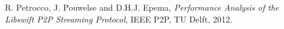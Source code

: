 \documentclass[pdftex, 12pt, a4paper]{report}
\begin{document}
\pagestyle{fancy}
\fancyhead{}
\fancyhead[LE, LO] {\today}



\tableofcontents

\pagebreak

\pagebreak
\pagebreak
\begin{thebibliography}{9}

   R. Petrocco, J. Pouwelse and D.H.J. Epema,
  \emph{Performance Analysis of the Libswift P2P Streaming Protocol},
  IEEE P2P, TU Delft,
  2012.
\end{thebibliography}
\end{document}
